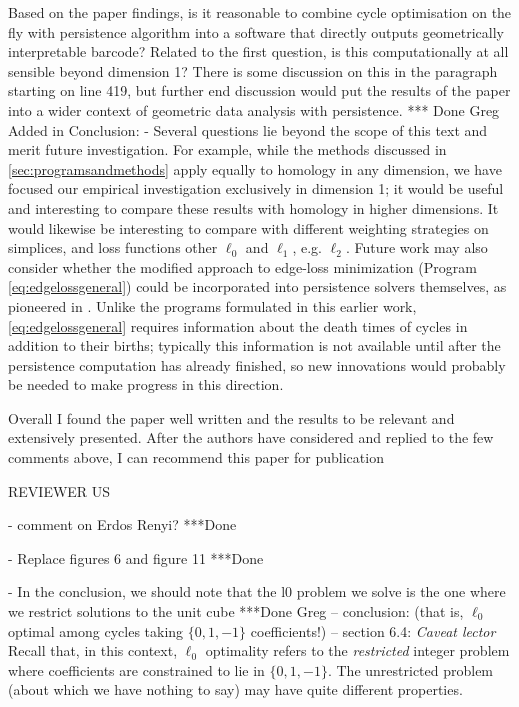 \documentclass{article}
\begin{document}
Based on the paper findings, is it reasonable to combine cycle optimisation on the fly with persistence algorithm into a software that directly outputs geometrically interpretable barcode? Related to the first question, is this computationally at all sensible beyond dimension 1? There is some discussion on this in the paragraph starting on line 419, but further end discussion would put the results of the paper into a wider context of geometric data analysis with persistence.
    *** Done 
    Greg
    Added in Conclusion:
    - Several questions lie beyond the scope of this text and merit future investigation.  For example, while the methods discussed in \se \ref{sec:programsandmethods} apply equally to homology in any dimension, we have focused our empirical investigation exclusively in dimension 1; it would be useful and interesting to compare these results with homology in higher dimensions.  It would likewise be interesting to compare with different weighting strategies on simplices, and loss functions other $\ell_0$ and $\ell_1$, e.g. $\ell_2$.  Future work may also consider whether the modified approach to edge-loss minimization (Program \eqref{eq:edgelossgeneral}) could be incorporated into persistence solvers themselves, as pioneered in \cite{Escolar2016}.  Unlike the programs formulated in this earlier work, \pr \ref{eq:edgelossgeneral} requires information about the death times of cycles in addition to their births; typically this information is not available until after the persistence computation has already finished, so new innovations would probably be needed to make progress in this direction. 


Overall I found the paper well written and the results to be relevant and extensively presented. After the authors have considered and replied to the few comments above, I can recommend this paper for publication


REVIEWER US

- comment on Erdos Renyi?
***Done

- Replace figures 6 and figure 11
***Done 

- In the conclusion, we should note that the l0 problem we solve is the one where we restrict solutions to the unit cube
    ***Done
    Greg
    -- conclusion: (that is, $\ell_0$ optimal among cycles taking $\{0,1,-1\}$ coefficients!)
    -- section 6.4: \emph{Caveat lector} Recall that, in this context, $\ell_0$ optimality refers to the \emph{restricted} integer problem where coefficients are constrained to lie in $\{0,1,-1\}$.  The unrestricted problem (about which we have nothing to say) may have quite different properties. 
    
\end{document}
